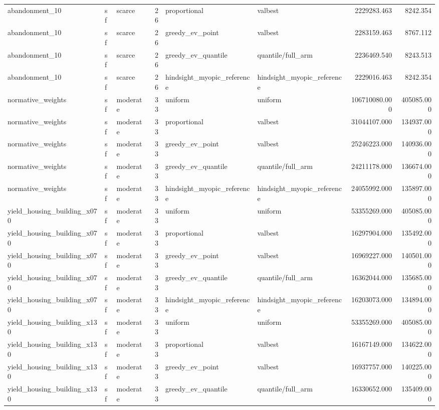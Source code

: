 \begin{tabular}{lllrllrr}
abandonment\_10 & sf & scarce & 26 & proportional & valbest & 2229283.463 & 8242.354 \\
abandonment\_10 & sf & scarce & 26 & greedy\_ev\_point & valbest & 2283159.463 & 8767.112 \\
abandonment\_10 & sf & scarce & 26 & greedy\_ev\_quantile & quantile/full\_arm & 2236469.540 & 8243.513 \\
abandonment\_10 & sf & scarce & 26 & hindsight\_myopic\_reference & hindsight\_myopic\_reference & 2229016.463 & 8242.354 \\
normative\_weights & sf & moderate & 33 & uniform & uniform & 106710080.000 & 405085.000 \\
normative\_weights & sf & moderate & 33 & proportional & valbest & 31044107.000 & 134937.000 \\
normative\_weights & sf & moderate & 33 & greedy\_ev\_point & valbest & 25246223.000 & 140936.000 \\
normative\_weights & sf & moderate & 33 & greedy\_ev\_quantile & quantile/full\_arm & 24211178.000 & 136674.000 \\
normative\_weights & sf & moderate & 33 & hindsight\_myopic\_reference & hindsight\_myopic\_reference & 24055992.000 & 135897.000 \\
yield\_housing\_building\_x070 & sf & moderate & 33 & uniform & uniform & 53355269.000 & 405085.000 \\
yield\_housing\_building\_x070 & sf & moderate & 33 & proportional & valbest & 16297904.000 & 135492.000 \\
yield\_housing\_building\_x070 & sf & moderate & 33 & greedy\_ev\_point & valbest & 16969227.000 & 140501.000 \\
yield\_housing\_building\_x070 & sf & moderate & 33 & greedy\_ev\_quantile & quantile/full\_arm & 16362044.000 & 135685.000 \\
yield\_housing\_building\_x070 & sf & moderate & 33 & hindsight\_myopic\_reference & hindsight\_myopic\_reference & 16203073.000 & 134894.000 \\
yield\_housing\_building\_x130 & sf & moderate & 33 & uniform & uniform & 53355269.000 & 405085.000 \\
yield\_housing\_building\_x130 & sf & moderate & 33 & proportional & valbest & 16167149.000 & 134622.000 \\
yield\_housing\_building\_x130 & sf & moderate & 33 & greedy\_ev\_point & valbest & 16937757.000 & 140225.000 \\
yield\_housing\_building\_x130 & sf & moderate & 33 & greedy\_ev\_quantile & quantile/full\_arm & 16330652.000 & 135409.000 \\

\end{tabular}
